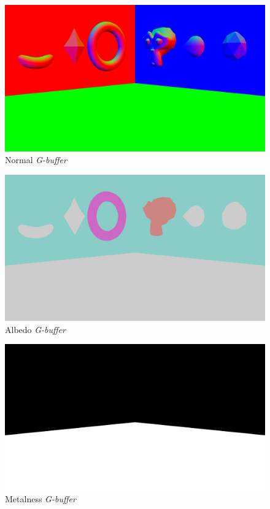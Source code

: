\documentclass[11pt,a4paper]{report}
\begin{document}
\begin{figure}[htp]
	\centering
	\includegraphics[width=\textwidth]{deferred/01normal.png}
	\caption{Normal \textit{G-buffer}}
	\label{deferred:normal}
\end{figure}

\begin{figure}[htp]
	\centering
	\includegraphics[width=\textwidth]{deferred/02albedo.png}
	\caption{Albedo \textit{G-buffer}}
	\label{deferred:albedo}
\end{figure}

\begin{figure}[htp]
	\centering
	\includegraphics[width=\textwidth]{deferred/03metalness.png}
	\caption{Metalness \textit{G-buffer}}
	\label{deferred:metalness}
\end{figure}
\end{document}
